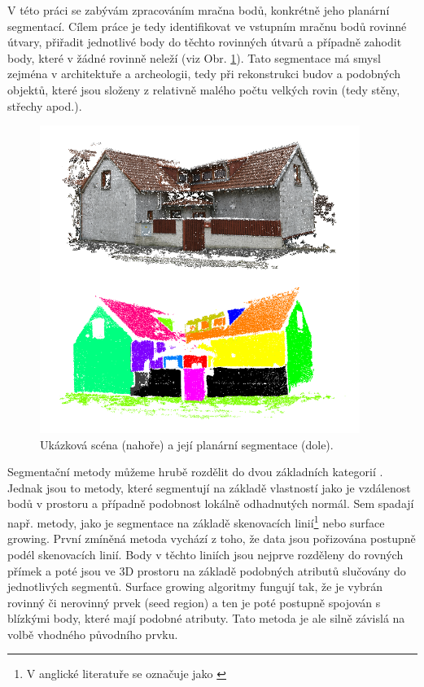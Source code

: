 \documentclass[11pt,twoside,a4paper]{book}
\begin{document}
V této práci se zabývám zpracováním mračna bodů, konkrétně jeho planární segmentací. Cílem práce je tedy
identifikovat ve vstupním mračnu bodů rovinné útvary, přiřadit jednotlivé body do těchto rovinných útvarů a
případně zahodit body, které v žádné rovinně neleží (viz Obr. \ref{fig:ukazkova-scena}). Tato segmentace
má smysl zejména v architektuře a archeologii, tedy při rekonstrukci budov a podobných objektů, které jsou
složeny z relativně malého počtu velkých rovin (tedy stěny, střechy apod.).

\begin{figure}[ht]
\begin{center}
\includegraphics[height=10cm]{figures/1-1-segmentace}
\caption{Ukázková scéna (nahoře) a její planární segmentace (dole).}
\label{fig:ukazkova-scena}
\end{center}
\end{figure}

Segmentační metody můžeme hrubě rozdělit do dvou základních kategorií \cite{Voss04}. Jednak jsou to metody, které segmentují na základě vlastností jako je vzdálenost bodů v prostoru a případně podobnost lokálně odhadnutých normál. Sem spadají např. metody, jako je segmentace na základě skenovacích linií\footnote{V anglické literatuře se označuje jako  \cite{Voss04}} nebo surface growing. První zmíněná metoda vychází z toho, že data jsou pořizována postupně podél skenovacích linií. Body v těchto liniích jsou nejprve rozděleny do rovných přímek a poté jsou ve 3D prostoru na základě podobných atributů slučovány do jednotlivých segmentů. Surface growing algoritmy fungují tak, že je vybrán rovinný či nerovinný prvek (seed region) a ten je poté postupně spojován s blízkými body, které mají podobné atributy. Tato metoda je ale silně závislá na volbě vhodného původního prvku.
\end{document}
